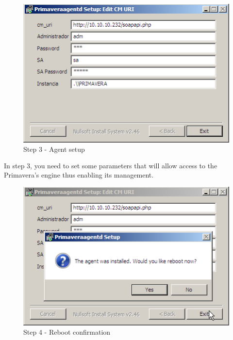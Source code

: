 \begin{figure}[H]
    \begin{center}
    \includegraphics[scale=0.6]{screenshots/primavera/primaverainstall_03.png}
    \caption{Step 3 - Agent setup}
    \label{fig:primavera_install_passo3}
    \end{center}
\end{figure}

In step 3, you need to set some parameters that will allow access to the Primavera's engine thus enabling its management.

\begin{figure}[H]
    \begin{center}
    \includegraphics[scale=0.6]{screenshots/primavera/primaverainstall_04.png}
    \caption{Step 4 - Reboot confirmation}
    \label{fig:primavera_install_passo4}
    \end{center}
\end{figure}

